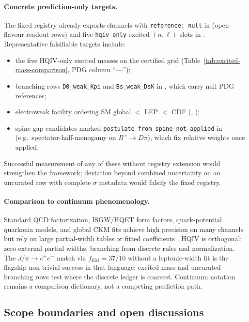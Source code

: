 \documentclass[11pt]{amsart}
\newcommand{\leanid}[1]{{\footnotesize\path{#1}}}
\begin{document}
\paragraph{Concrete prediction-only targets.}
The fixed registry already exports channels with \texttt{reference: null} in
 (open-flavour readout rows) and five
\texttt{hqiv\_only} excited $(n,\ell)$ slots in
.
Representative falsifiable targets include:
\begin{itemize}[leftmargin=2em]
\item the five HQIV-only excited masses on the certified grid
(Table~\ref{tab:excited-mass-comparison}, PDG column ``---'');
\item branching rows \texttt{D0\_weak\_Kpi} and \texttt{Bs\_weak\_DsK} in
, which carry null PDG references;
\item electroweak facility ordering SM global $<$ LEP $<$ CDF
(\leanid{sm\_global\_ref\_lt\_lep\_ref}, \leanid{lep\_ref\_lt\_cdf\_ref});
\item spine gap candidates marked \texttt{postulate\_from\_spine\_not\_applied} in
 (e.g.\ spectator-half-monogamy on
$B^+\to D\pi$), which fix relative weights once applied.
\end{itemize}
Successful measurement of any of these without registry extension would strengthen
the framework; deviation beyond combined uncertainty on an uncurated row with
complete $\sigma$ metadata would falsify the fixed registry.

\paragraph{Comparison to continuum phenomenology.}
Standard QCD factorization, ISGW/HQET form factors, quark-potential quarkonia
models, and global CKM fits achieve high precision on many channels but rely on
large partial-width tables or fitted coefficients \cite{peskin1995,schwartz2014,pdg2024}.
HQIV is orthogonal: zero external partial widths, branching from discrete rules
and normalization.
The $J/\psi\to e^+e^-$ match via $f_{\mathrm{EM}}=37/10$ without a leptonic-width
fit is the flagship non-trivial success in that language; excited-mass and
uncurated branching rows test where the discrete ledger is coarsest.
Continuum notation remains a comparison dictionary, not a competing prediction path.

\subsection{Scope boundaries and open discussions}
\label{sec:scope-boundaries}
\end{document}
